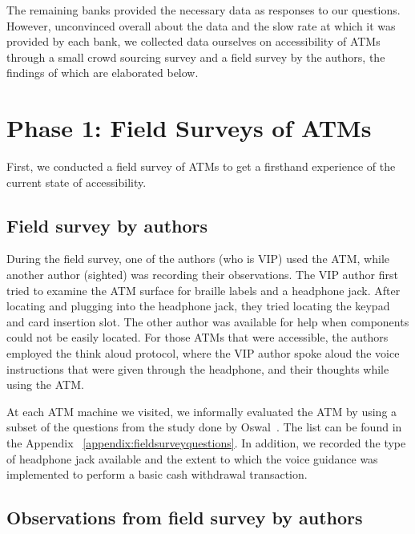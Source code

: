 The remaining banks provided the necessary data as responses to our questions. However, unconvinced overall about the data and the slow rate at which it was provided by each bank, we collected data ourselves on accessibility of ATMs through a small crowd sourcing survey and a field survey by the authors, the findings of which are elaborated below.

\section{Phase 1: Field Surveys of ATMs}
\label{sec:phase1fieldsurvey}
First, we conducted a field survey of ATMs to get a firsthand experience of the current state of accessibility.

\subsection{Field survey by authors}
\label{ssec:authorfieldsurvey}

During the field survey, one of the authors (who is VIP) used the ATM, while another author (sighted) was recording their observations. The VIP author first tried to examine the ATM surface for braille labels and a headphone jack. After locating and plugging into the headphone jack, they tried locating the keypad and card insertion slot. The other author was available for help when components could not be easily located. For those ATMs that were accessible, the authors employed the think aloud protocol, where the VIP author spoke aloud the voice instructions that were given through the headphone, and their thoughts while using the ATM.

At each ATM machine we visited, we informally evaluated the ATM by using a subset of the questions from the study done by Oswal~\cite{oswal2012accessible}. The list can be found in the Appendix ~\ref{appendix:fieldsurveyquestions}. In addition, we recorded the type of headphone jack available and the extent to which the voice guidance was implemented to perform a basic cash withdrawal transaction.

\subsection{Observations from field survey by authors}
\label{ssec:observationsfieldsurvey}

